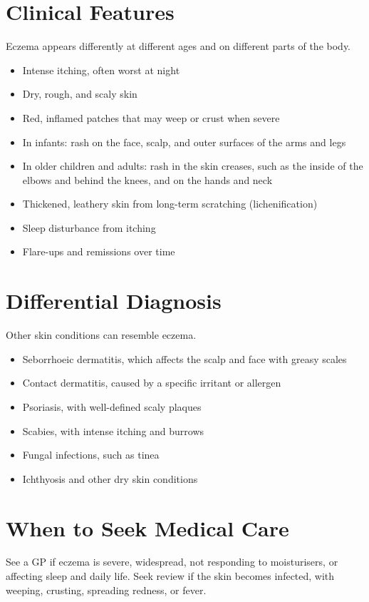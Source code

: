 \section*{Clinical Features}
Eczema appears differently at different ages and on different parts of the body.
\begin{itemize}
    \item Intense itching, often worst at night
    \item Dry, rough, and scaly skin
    \item Red, inflamed patches that may weep or crust when severe
    \item In infants: rash on the face, scalp, and outer surfaces of the arms and legs
    \item In older children and adults: rash in the skin creases, such as the inside of the elbows and behind the knees, and on the hands and neck
    \item Thickened, leathery skin from long-term scratching (lichenification)
    \item Sleep disturbance from itching
    \item Flare-ups and remissions over time
\end{itemize}

\section*{Differential Diagnosis}
Other skin conditions can resemble eczema.
\begin{itemize}
    \item Seborrhoeic dermatitis, which affects the scalp and face with greasy scales
    \item Contact dermatitis, caused by a specific irritant or allergen
    \item Psoriasis, with well-defined scaly plaques
    \item Scabies, with intense itching and burrows
    \item Fungal infections, such as tinea
    \item Ichthyosis and other dry skin conditions
\end{itemize}

\section*{When to Seek Medical Care}
See a GP if eczema is severe, widespread, not responding to moisturisers, or affecting sleep and daily life. Seek review if the skin becomes infected, with weeping, crusting, spreading redness, or fever.

